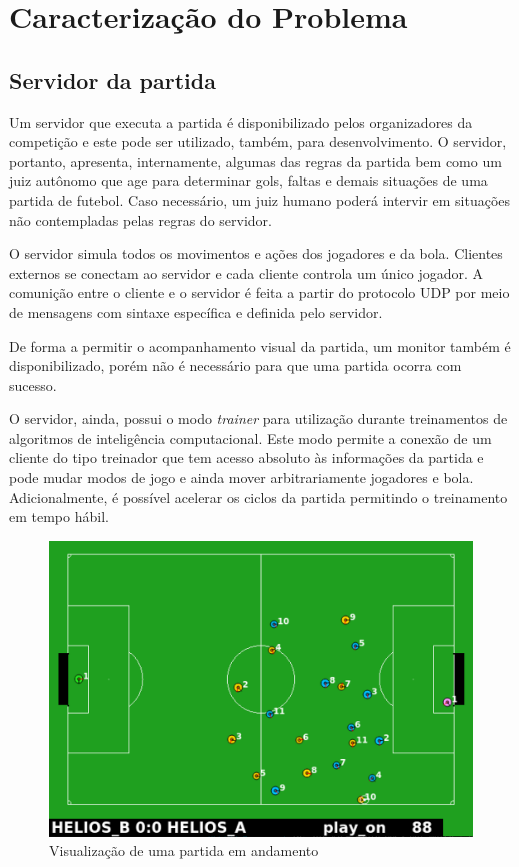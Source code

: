 \section{Caracterização do Problema}

\subsection{Servidor da partida}
\par Um servidor que executa a partida é disponibilizado pelos organizadores da competição e este pode ser utilizado, também, para desenvolvimento. O servidor, portanto, apresenta, internamente, algumas das regras da partida bem como um juiz autônomo que age para determinar gols, faltas e demais situações de uma partida de futebol. Caso necessário, um juiz humano poderá intervir em situações não contempladas pelas regras do servidor.
\par O servidor simula todos os movimentos e ações dos jogadores e da bola. Clientes externos se conectam ao servidor e cada cliente controla um único jogador. A comunição entre o cliente e o servidor é feita a partir do protocolo UDP por meio de mensagens com sintaxe específica e definida pelo servidor.
\par De forma a permitir o acompanhamento visual da partida, um monitor também é disponibilizado, porém não é necessário para que uma partida ocorra com sucesso.
\par O servidor, ainda, possui o modo \textit{trainer} para utilização durante treinamentos de algoritmos de inteligência computacional. Este modo permite a conexão de um cliente do tipo treinador que tem acesso absoluto às informações da partida e pode mudar modos de jogo e ainda mover arbitrariamente jogadores e bola. Adicionalmente, é possível acelerar os ciclos da partida permitindo o treinamento em tempo hábil.

\begin{figure}[h]
	\includegraphics[width=0.7\linewidth]{figs/server.png}
	\centering
	\caption{Visualização de uma partida em andamento}
	\label{fig:rcssserver}
\end{figure}

